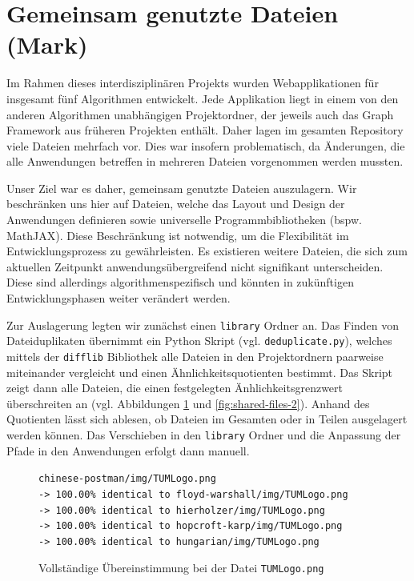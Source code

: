 \section{Gemeinsam genutzte Dateien (Mark)}
Im Rahmen dieses interdisziplinären Projekts wurden Webapplikationen für insgesamt fünf Algorithmen entwickelt. Jede Applikation liegt in einem von den anderen Algorithmen unabhängigen Projektordner, der jeweils auch das Graph Framework aus früheren Projekten enthält. Daher lagen im gesamten Repository viele Dateien mehrfach vor. Dies war insofern problematisch, da Änderungen, die alle Anwendungen betreffen in mehreren Dateien vorgenommen werden mussten.

Unser Ziel war es daher, gemeinsam genutzte Dateien auszulagern. Wir beschränken uns hier auf Dateien, welche das Layout und Design der Anwendungen definieren sowie universelle Programmbibliotheken (bspw. MathJAX). Diese Beschränkung ist notwendig, um die Flexibilität im Entwicklungsprozess zu gewährleisten. Es existieren weitere Dateien, die sich zum aktuellen Zeitpunkt anwendungsübergreifend nicht signifikant unterscheiden. Diese sind allerdings algorithmenspezifisch und könnten in zukünftigen Entwicklungsphasen weiter verändert werden.

Zur Auslagerung legten wir zunächst einen \texttt{library} Ordner an. Das Finden von Dateiduplikaten übernimmt ein Python Skript (vgl. \texttt{deduplicate.py}), welches mittels der \texttt{difflib} Bibliothek alle Dateien in den Projektordnern paarweise miteinander vergleicht und einen Ähnlichkeitsquotienten bestimmt. Das Skript zeigt dann alle Dateien, die einen festgelegten Änhlichkeitsgrenzwert überschreiten an (vgl. Abbildungen \ref{fig:shared-files-1} und \ref{fig:shared-files-2}). Anhand des Quotienten lässt sich ablesen, ob Dateien im Gesamten oder in Teilen ausgelagert werden können. Das Verschieben in den \texttt{library} Ordner und die Anpassung der Pfade in den Anwendungen erfolgt dann manuell.

\begin{figure}[h!]
\noindent\texttt{chinese-postman/img/TUMLogo.png \\
-> 100.00\% identical to floyd-warshall/img/TUMLogo.png \\
-> 100.00\% identical to hierholzer/img/TUMLogo.png \\
-> 100.00\% identical to hopcroft-karp/img/TUMLogo.png \\
-> 100.00\% identical to hungarian/img/TUMLogo.png
}
\caption[Gemeinsame Dateien, Beispiel 1]{Vollständige Übereinstimmung bei der Datei \texttt{TUMLogo.png}}\label{fig:shared-files-1}
\end{figure}

